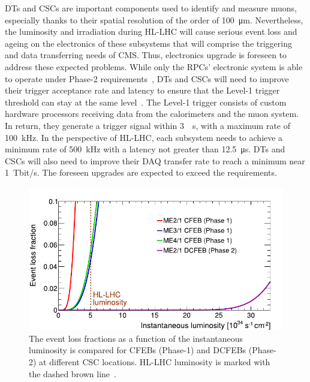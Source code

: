	\acl{DT}s and \acl{CSC}s are important components used to identify and measure muons, especially thanks to their spatial resolution of the order of \SI{100}{\micro m}. Nevertheless, the luminosity and irradiation during HL-LHC will cause serious event loss and ageing on the electronics of these subsystems that will comprise the triggering and data transferring needs of CMS. Thus, electronics upgrade is foreseen to address these expected problems. While only the RPCs' electronic system is able to operate under Phase-2 requirements~\cite{CMSIITP}, DTs and CSCs will need to improve their trigger acceptance rate and latency to ensure that the Level-1 trigger threshold can stay at the same level~\cite{LEVEL1IR}. The Level-1 trigger consists of custom hardware processors receiving data from the calorimeters and the muon system. In return, they generate a trigger signal within \SI{3}{\mu s}, with a maximum rate of \SI{100}{kHz}. In the perspective of HL-LHC, each subsystem needs to achieve a minimum rate of \SI{500}{kHz} with a latency not greater than \SI{12.5}{\micro s}. DTs and CSCs will also need to improve their \acf{DAQ} transfer rate to reach a minimum near \SI{1}{Tbit/s}. The foreseen upgrades are expected to exceed the requirements.
	
\endgroup

\begingroup\setlength{\intextsep}{0pt}\setlength{\columnsep}{15pt}

	\begin{figure}
		\centering
		\includegraphics[width=\linewidth]{fig/chapt3/CSC-event-loss.pdf}
		\caption{\label{fig:CSC-event-loss} The event loss fractions as a function of the instantaneous luminosity is compared for CFEBs (Phase-1) and DCFEBs (Phase-2) at different CSC locations. HL-LHC luminosity is marked with the dashed brown line~\cite{PHASEIITP}.}
	\end{figure}
	
